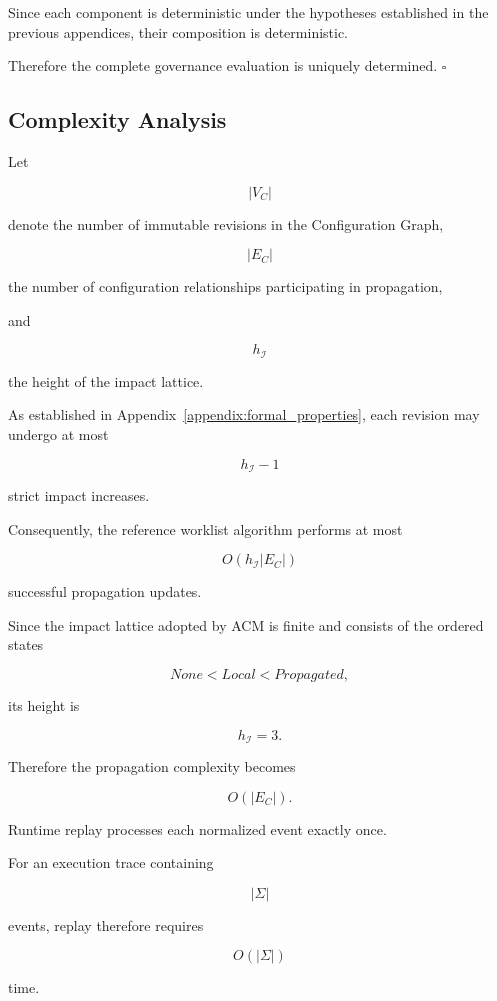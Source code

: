 \documentclass[10pt]{article}
\begin{document}
Since each component is deterministic under the hypotheses established in the previous appendices, their composition is deterministic.

Therefore the complete governance evaluation is uniquely determined. 
\hfill$\square$

\subsection{Complexity Analysis}
\label{appendix:complexity_analysis}

Let

\[
|V_C|
\]

denote the number of immutable revisions in the Configuration Graph,

\[
|E_C|
\]

the number of configuration relationships participating in propagation,

and

\[
h_{\mathcal I}
\]

the height of the impact lattice.

As established in Appendix~\ref{appendix:formal_properties},
each revision may undergo at most

\[
h_{\mathcal I}-1
\]

strict impact increases.

Consequently, the reference worklist algorithm performs at most

\[
O(h_{\mathcal I}|E_C|)
\]

successful propagation updates.

Since the impact lattice adopted by ACM is finite and consists of the ordered
states

\[
None
<
Local
<
Propagated,
\]

its height is

\[
h_{\mathcal I}=3.
\]

Therefore the propagation complexity becomes

\[
O(|E_C|).
\]

Runtime replay processes each normalized event exactly once.

For an execution trace containing

\[
|\Sigma|
\]

events, replay therefore requires

\[
O(|\Sigma|)
\]

time.
\end{document}
